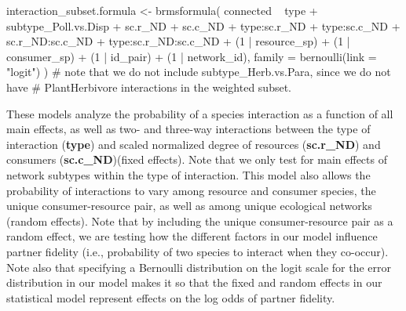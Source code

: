 \documentclass[11pt,]{article}
\newenvironment{Shaded}{}{}
\newcommand{\KeywordTok}[1]{\textcolor[rgb]{0.00,0.00,1.00}{#1}}
\newcommand{\DataTypeTok}[1]{#1}
\newcommand{\DecValTok}[1]{#1}
\newcommand{\StringTok}[1]{\textcolor[rgb]{0.00,0.50,0.50}{#1}}
\newcommand{\CommentTok}[1]{\textcolor[rgb]{0.00,0.50,0.00}{#1}}
\newcommand{\OperatorTok}[1]{#1}
\newcommand{\NormalTok}[1]{#1}
\begin{document}
\begin{Shaded}
\begin{Highlighting}[]
\NormalTok{interaction_subset.formula <-}\StringTok{ }\KeywordTok{brmsformula}\NormalTok{(}
\NormalTok{  connected }\OperatorTok{~}\StringTok{ }\NormalTok{type }\OperatorTok{+}\StringTok{ }\NormalTok{subtype_Poll.vs.Disp }\OperatorTok{+}\StringTok{ }\NormalTok{sc.r_ND }\OperatorTok{+}\StringTok{ }\NormalTok{sc.c_ND }\OperatorTok{+}\StringTok{ }
\StringTok{    }\NormalTok{type}\OperatorTok{:}\NormalTok{sc.r_ND }\OperatorTok{+}\StringTok{ }\NormalTok{type}\OperatorTok{:}\NormalTok{sc.c_ND }\OperatorTok{+}\StringTok{ }\NormalTok{sc.r_ND}\OperatorTok{:}\NormalTok{sc.c_ND }\OperatorTok{+}
\StringTok{    }\NormalTok{type}\OperatorTok{:}\NormalTok{sc.r_ND}\OperatorTok{:}\NormalTok{sc.c_ND }\OperatorTok{+}
\StringTok{    }\NormalTok{(}\DecValTok{1} \OperatorTok{|}\StringTok{ }\NormalTok{resource_sp) }\OperatorTok{+}\StringTok{ }\NormalTok{(}\DecValTok{1} \OperatorTok{|}\StringTok{ }\NormalTok{consumer_sp) }\OperatorTok{+}\StringTok{ }\NormalTok{(}\DecValTok{1} \OperatorTok{|}\StringTok{ }\NormalTok{id_pair) }\OperatorTok{+}\StringTok{ }\NormalTok{(}\DecValTok{1} \OperatorTok{|}\StringTok{ }\NormalTok{network_id),}
  \DataTypeTok{family =} \KeywordTok{bernoulli}\NormalTok{(}\DataTypeTok{link =} \StringTok{"logit"}\NormalTok{) }
\NormalTok{) }\CommentTok{# note that we do not include subtype_Herb.vs.Para, since we do not have}
\CommentTok{# PlantHerbivore interactions in the weighted subset.}
\end{Highlighting}
\end{Shaded}

These models analyze the probability of a species interaction as a
function of all main effects, as well as two- and three-way interactions
between the type of interaction (\textbf{type}) and scaled normalized
degree of resources (\textbf{sc.r\_ND}) and consumers
(\textbf{sc.c\_ND})(fixed effects). Note that we only test for main
effects of network subtypes within the type of interaction. This model
also allows the probability of interactions to vary among resource and
consumer species, the unique consumer-resource pair, as well as among
unique ecological networks (random effects). Note that by including the
unique consumer-resource pair as a random effect, we are testing how the
different factors in our model influence partner fidelity (i.e.,
probability of two species to interact when they co-occur). Note also
that specifying a Bernoulli distribution on the logit scale for the
error distribution in our model makes it so that the fixed and random
effects in our statistical model represent effects on the log odds of
partner fidelity.
\end{document}
